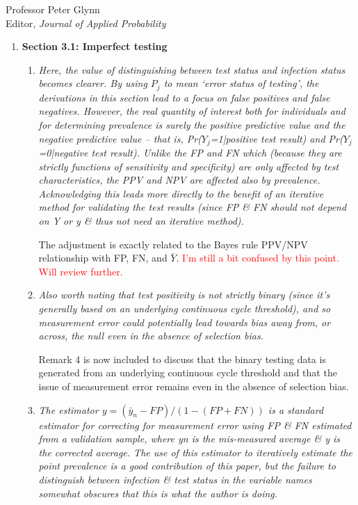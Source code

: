 \documentclass[11pt]{letter} %
\begin{document}
\begin{letter}{Professor
	Peter Glynn\\
	Editor, {\em Journal of Applied Probability}}
\begin{enumerate}
\begin{enumerate}
	This is now stated explicitly in Section 3, paragraph 2.
	\vspace{5mm}
\end{enumerate}
\item {\bf Section 3.1: Imperfect testing}
\begin{enumerate}
	\item {\it Here, the value of distinguishing between test status and infection status becomes clearer. By using $P_j$ to mean ‘error status of testing’, the derivations in this section lead to a focus on false positives and false negatives. However, the real quantity of interest both for individuals and for determining prevalence is surely the positive predictive value and the negative predictive value – that is, Pr($Y_j$=1|positive test result) and Pr($Y_j$=0|negative test result). Unlike the FP and FN which (because they are strictly functions of sensitivity and specificity) are only affected by test characteristics, the PPV and NPV are affected also by prevalence. Acknowledging this leads more directly to the benefit of an iterative method for validating the test results (since FP \& FN should not depend on Y or y \& thus not need an iterative method).}
	\vspace{5mm}

	The adjustment is exactly related to the Bayes rule PPV/NPV relationship with FP, FN, and $\bar Y$.
	\textcolor{red}{I'm still a bit confused by this point.  Will review further.}
	\vspace{5mm}
	\item {\it Also worth noting that test positivity is not strictly binary (since it’s generally based on an underlying continuous cycle threshold), and so measurement error could potentially lead towards bias away from, or across, the null even in the absence of selection bias.}
	\vspace{5mm}

	Remark 4 is now included to discuss that the binary testing data is generated from an underlying continuous cycle threshold and that the issue of measurement error remains even in the absence of selection bias.
	\vspace{5mm}

	\item {\it The estimator $y = (\bar y_n-FP) /(1-(FP+FN))$ is a standard estimator for correcting for measurement error using FP \& FN estimated from a validation sample, where yn is the mis-measured average \& y is the corrected average. The use of this estimator to iteratively estimate the point prevalence is a good contribution of this paper, but the failure to distinguish between infection \& test status in the variable names somewhat obscures that this is what the author is doing.}
	\vspace{5mm}


\end{enumerate}
\end{enumerate}
\end{letter}
\end{document}
